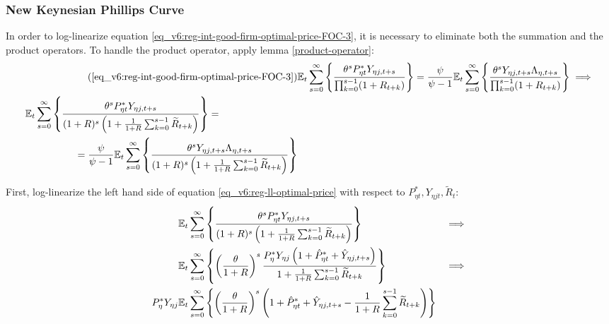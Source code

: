 \documentclass[../thesis.tex]{subfiles}
\begin{document}

\subsubsection*{New Keynesian Phillips Curve}

In order to log-linearize equation \ref{eq_v6:reg-int-good-firm-optimal-price-FOC-3}, it is necessary to eliminate both the summation and the product operators. To handle the product operator, apply lemma \ref{product-operator}:
\begin{align}
	\tag{\ref{eq_v6:reg-int-good-firm-optimal-price-FOC-3}}
	& \E \sum_{s=0}^{\infty} \left\{ \frac{\theta^s P_{\eta t}^{\ast} Y_{\eta j,t+s}}{ \prod_{k=0}^{s-1}(1+R_{t+k})} \right\} = \frac{\psi}{\psi-1} \E \sum_{s=0}^{\infty} \left\{ \frac{\theta^s Y_{\eta j,t+s} \Lambda_{\eta, t+s}}{\prod_{k=0}^{s-1}(1+R_{t+k})} \right\} \implies
	\\
	\begin{split}
		& \E \sum_{s=0}^{\infty} \left\{ \frac{\theta^s P_{\eta t}^{\ast} Y_{\eta j,t+s}}{ (1 + R)^s \left( 1 + \frac{1}{1 + R} \sum_{k=0}^{s-1} \widetilde{R}_{t+k} \right)} \right\} = 
		\\ & \quad \quad \quad \quad \quad = \frac{\psi}{\psi-1} \E \sum_{s=0}^{\infty} \left\{ \frac{\theta^s Y_{\eta j,t+s} \Lambda_{\eta, t+s}}{ (1 + R)^s \left( 1 + \frac{1}{1 + R} \sum_{k=0}^{s-1} \widetilde{R}_{t+k} \right)} \right\} \label{eq_v6:reg-ll-optimal-price}
	\end{split}
\end{align}

First, log-linearize the left hand side of equation \ref{eq_v6:reg-ll-optimal-price} with respect to \( P_{\eta t}^{\ast}, Y_{\eta j t}, \widetilde{R}_t \):
\begin{alignat}{2}
	& {\mathbb{E}_{t}} \sum_{s=0}^{\infty} \left\{ \frac{\theta^s P_{\eta t}^{\ast} Y_{\eta j,t+s}}{ (1 + R)^s \left( 1 + \frac{1}{1 + R} \sum_{k=0}^{s-1} \widetilde{R}_{t+k} \right)} \right\} &\implies \nonumber \\
	& {\mathbb{E}_{t}} \sum_{s=0}^{\infty} \left\{ \left( \frac{\theta}{1 + R} \right)^s  \frac{ P_{\eta}^{\ast} Y_{\eta j} \left( 1 + \hat{P}_{\eta t}^{\ast} + \hat{Y}_{\eta j, t+s} \right)}{ 1 + \frac{1}{1 + R} \sum_{k=0}^{s-1} \widetilde{R}_{t+k}} \right\} &\implies \nonumber \\
	P_{\eta}^{\ast} Y_{\eta j} &{\mathbb{E}_{t}} \sum_{s=0}^{\infty} \left\{ \left( \frac{\theta}{1 + R} \right)^s \left( 1 + \hat{P}_{\eta t}^{\ast} + \hat{Y}_{\eta j, t+s} - \frac{1}{1 + R} \sum_{k=0}^{s-1} \widetilde{R}_{t+k} \right) \right\} & \nonumber
\end{alignat}
\end{document}
